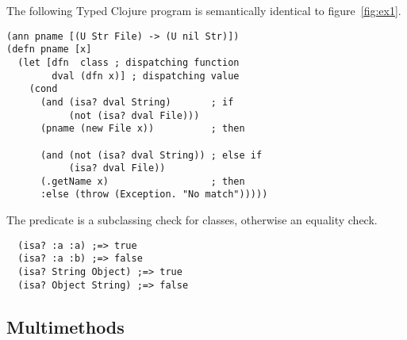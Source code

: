 The following Typed Clojure program is semantically identical to figure~\ref{fig:ex1}.

\begin{verbatim}
(ann pname [(U Str File) -> (U nil Str)])
(defn pname [x]
  (let [dfn  class ; dispatching function
        dval (dfn x)] ; dispatching value
    (cond
      (and (isa? dval String)       ; if
           (not (isa? dval File))) 
      (pname (new File x))          ; then

      (and (not (isa? dval String)) ; else if
           (isa? dval File))       
      (.getName x)                  ; then
      :else (throw (Exception. "No match")))))
\end{verbatim}

The  predicate 
is a subclassing check for classes, otherwise
an equality check.

\begin{verbatim}
  (isa? :a :a) ;=> true
  (isa? :a :b) ;=> false
  (isa? String Object) ;=> true
  (isa? Object String) ;=> false
\end{verbatim}

\subsection{Multimethods}

\label{sec:multioverview}

%
%

